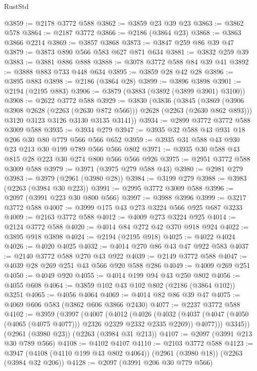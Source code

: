 \begin{lexlean}{RustStd}
\begin{coremodule}
{\begin{coremodule}
{{{{{{{{{{{{{{{@3859 := @2178 @3772 @588
@3862 := @3859 @23 @39 @23
@3863 := @3862 @578
@3864 := @2187 @3772
@3866 := @2186 (@3864 @23)
@3868 := @3863 @3866 @2214
@3869 := @3857 @3868
@3873 := @3847 @259 @86 @39 @47
@3879 := @3873 @890 @566 @583 @627 @871 @634
@3881 := @3832 @259 @39
@3883 := @3881 @886 @888
@3888 := @3078 @3772 @588 @84 @39 @41
@3892 := @3888 @883 @733 @448 @634
@3895 := @3859 @28 @42 @28
@3896 := @3895 @883
@3898 := @2186 (@3864 @28)
@3899 := @3896 @3898
@3901 := @2194 (@2195 @883)
@3906 := @3879 (@3883 (@3892 (@3899 @3901) @3100))
@3908 := @2622 @3772 @588
@3929 := @3830
    (@3836
      (@3845
        (@3869 (@3906 @3908 @2628 (@2263 (@2630 @872 @566))) @2628 (@2263 (@2630 @862 @893)))
        @3120
        @3123
        @3126
        @3130
        @3135
        @3141))
@3934 := @2899 @3772 @3772 @588 @3009 @588
@3935 := @3934 @279
@3947 := @3935 @32 @588 @43 @931 @18 @206 @30 @80 @779 @566 @566 @652
@3959 := @3935 @31 @588 @43 @930 @23 @213 @30 @199 @789 @566 @566 @802
@3971 := @3935 @30 @588 @43 @815 @28 @223 @30 @274 @800 @566 @566 @926
@3975 := @2951 @3772 @588 @3009 @588
@3979 := @3971 (@3975 @279 @588 @43)
@3980 := @2981 @279
@3983 := @3979 (@2961 (@3980 @28))
@3984 := @3199 @279
@3988 := @3983 (@2263 (@3984 @30 @223))
@3991 := @2995 @3772 @3009 @588
@3996 := @2097 (@3991 @223 @30 @800 @566)
@3997 := @3988 @3996
@3999 := @3217 @3772 @588
@4007 := @3999 @175 @43 @273 @3224 @566 @925 @687 @3233
@4009 := @2163 @3772 @588
@4012 := @4009 @273 @3224 @925
@4014 := @2124 @3772 @588
@4020 := @4014 @84 @272 @42 @370 @918 @924
@4022 := @3895 @918 @3898
@4024 := @2194 (@2195 @918)
@4025 := @4022 @4024
@4026 := @4020 @4025
@4032 := @4014 @270 @86 @43 @47 @922 @583
@4037 := @2140 @3772 @588 @270 @43 @922
@4039 := @2149 @3772 @588
@4047 := @4039 @28 @269 @251 @43 @566 @920 @588 @286
@4049 := @4009 @269 @251
@4050 := @4049 @920
@4055 := @4014 @199 @94 @43 @250 @802
@4056 := @4055 @608
@4064 := @3859 @102 @43 @102 @802 (@2186 (@3864 @102)) @3251
@4065 := @4056 @4064
@4069 := @4014 @82 @86 @39 @47
@4075 := @4069 @606 @583 (@3862 @606 @3866 @2430)
@4077 := @2237 @3772 @588
@4102 := @3959
    (@3997
      (@4007
        (@4012
          (@4026
            (@4032
              (@4037 (@4047 (@4050 (@4065 (@4075 @4077))) @2326 @2329 @2332 @2335 @2269))
              @4077)))
        @3345))
    (@2961 (@3980 @23))
    (@2263 (@3984 @31 @213))
@4107 := @2097 (@3991 @213 @30 @789 @566)
@4108 := @4102 @4107
@4110 := @2103 @3772 @588
@4123 := @3947 (@4108 (@4110 @199 @43 @802 @4064)) (@2961 (@3980 @18)) (@2263 (@3984 @32 @206))
@4128 := @2097 (@3991 @206 @30 @779 @566)
}}}}}}}}}}}}}}}
\end{coremodule}}
\end{coremodule}
\end{lexlean}
